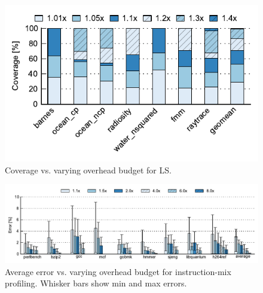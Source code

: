 \begin{figure}
  \begin{center}
    \includegraphics[width=\linewidth]{figs/data_ls_sweep.pdf}
    \vspace{-0.2in}
    \caption{Coverage vs. varying overhead budget for LS.}
    \label{fig:evaluation.ls_sweep}
    \vspace{-0.1in}
  \end{center}
\end{figure}

\begin{figure}
  \begin{center}
    \includegraphics[width=\linewidth, clip=true]{figs/data_imp_sweep.pdf}
    \vspace{-0.2in}
    \caption{Average error vs. varying overhead budget for instruction-mix profiling. Whisker bars show min and max errors.}
    \label{fig:evaluation.imp_sweep}
    \vspace{-0.1in}
  \end{center}
\end{figure}

